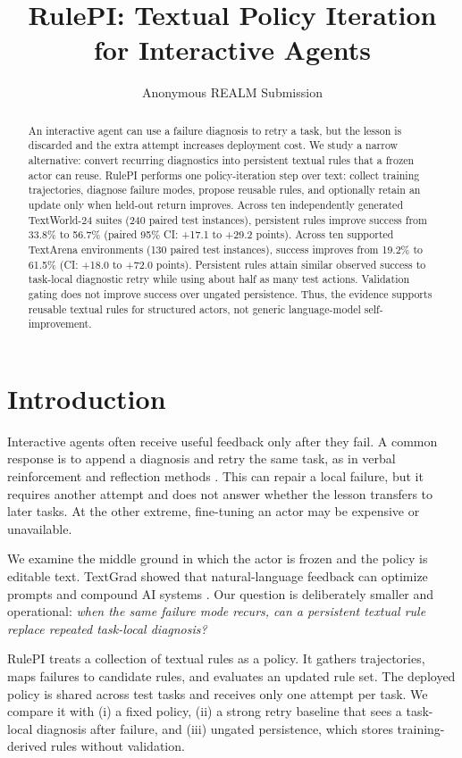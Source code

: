 \documentclass[11pt]{article}
\title{RulePI: Textual Policy Iteration for Interactive Agents}
\author{Anonymous REALM Submission}
\begin{document}
\maketitle

\begin{abstract}
An interactive agent can use a failure diagnosis to retry a task, but the lesson is discarded and the extra attempt increases deployment cost.
We study a narrow alternative: convert recurring diagnostics into persistent textual rules that a frozen actor can reuse.
RulePI performs one policy-iteration step over text: collect training trajectories, diagnose failure modes, propose reusable rules, and optionally retain an update only when held-out return improves.
Across ten independently generated TextWorld-24 suites (240 paired test instances), persistent rules improve success from 33.8\% to 56.7\% (paired 95\% CI: +17.1 to +29.2 points).
Across ten supported TextArena environments (130 paired test instances), success improves from 19.2\% to 61.5\% (CI: +18.0 to +72.0 points).
Persistent rules attain similar observed success to task-local diagnostic retry while using about half as many test actions.
Validation gating does not improve success over ungated persistence.
Thus, the evidence supports reusable textual rules for structured actors, not generic language-model self-improvement.
\end{abstract}

\section{Introduction}

Interactive agents often receive useful feedback only after they fail.
A common response is to append a diagnosis and retry the same task, as in verbal reinforcement and reflection methods \citep{shinn2023reflexion}.
This can repair a local failure, but it requires another attempt and does not answer whether the lesson transfers to later tasks.
At the other extreme, fine-tuning an actor may be expensive or unavailable.

We examine the middle ground in which the actor is frozen and the policy is editable text.
TextGrad showed that natural-language feedback can optimize prompts and compound AI systems \citep{yuksekgonul2025textgrad}.
Our question is deliberately smaller and operational: \emph{when the same failure mode recurs, can a persistent textual rule replace repeated task-local diagnosis?}

RulePI treats a collection of textual rules as a policy.
It gathers trajectories, maps failures to candidate rules, and evaluates an updated rule set.
The deployed policy is shared across test tasks and receives only one attempt per task.
We compare it with (i) a fixed policy, (ii) a strong retry baseline that sees a task-local diagnosis after failure, and (iii) ungated persistence, which stores training-derived rules without validation.
\end{document}
